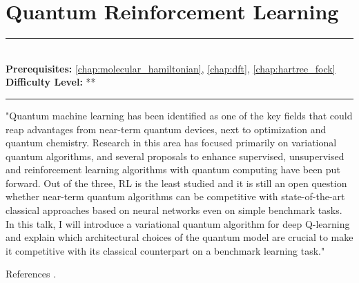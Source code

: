 \documentclass[book.tex]{subfiles}
\begin{document}
\chapter{Quantum Reinforcement Learning}
\label{chap:quantum_rl}
\noindent\rule{11cm}{0.4pt} \\
\textbf{Prerequisites:} \autoref{chap:molecular_hamiltonian}, \autoref{chap:dft}, \autoref{chap:hartree_fock} \\
\textbf{Difficulty Level:} ** \\
\noindent\rule{11cm}{0.4pt}
\vspace{5mm}

"Quantum machine learning has been identified as one of the key fields that could reap advantages from near-term quantum devices, next to optimization and quantum chemistry. Research in this area has focused primarily on variational quantum algorithms, and several proposals to enhance supervised, unsupervised and reinforcement learning algorithms with quantum computing have been put forward. Out of the three, RL is the least studied and it is still an open question whether near-term quantum algorithms can be competitive with state-of-the-art classical approaches based on neural networks even on simple benchmark tasks. In this talk, I will introduce a variational quantum algorithm for deep Q-learning and explain which architectural choices of the quantum model are crucial to make it competitive with its classical counterpart on a benchmark learning task."

References \cite{skolik2021quantum}.
\end{document}
